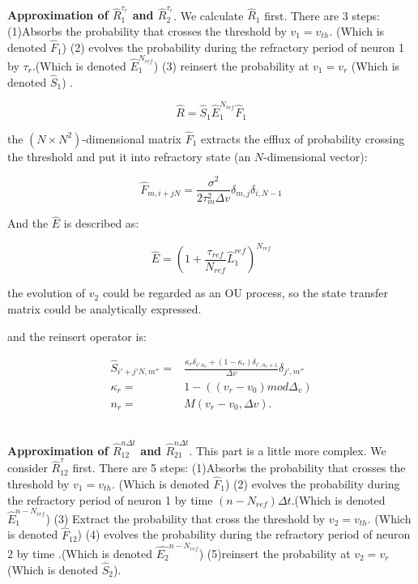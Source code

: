 \documentclass{article}
\begin{document}
	~\\
	
	\textbf{Approximation of $\hat{R}_1^{\tau_r}$ and $\hat{R}_2^{\tau_r}$}. We calculate $\hat{R}_1$ first. There are 3 steps:(1)Absorbs the probability that crosses the threshold by $v_1=v_{th}$. (Which is denoted $\hat{F}_1$) (2) evolves the probability during the refractory period of neuron 1 by $\tau_r$.(Which is denoted $\hat{E}_1^{N_{ref}}$) (3) reinsert the probability at $v_1=v_r$ (Which is denoted $\hat{S}_1$) . 
	
	\begin{equation}
     	\hat{R}=\hat{S}_1\hat{E}_1^{N_{ref}}\hat{F}_1
	\end{equation}
	
	the $(N\times N^2)$-dimensional matrix $\hat{F}_1$ extracts the efflux of probability crossing the threshold and put it into refractory state (an $N$-dimensional vector):
	
	\begin{equation}
	 	\hat{F}_{m,i+jN}=\frac{\sigma^2}{2\tau_m^2\Delta v}\delta_{m,j}\delta_{i,N-1}
	\end{equation}
	
	And the $\hat{E}$ is described as:
	
	\begin{equation}
		\hat{E}=(1+\frac{\tau_{ref}}{N_{ref}}\hat{L}_1^{ref})^{N_{ref}}
	\end{equation}
	
	the evolution of $v_2$ could be regarded as an OU process, so the state transfer matrix could be analytically expressed.
	
	and the reinsert operator is:
	
	\begin{align}
		\hat{S}_{i'+j'N,m''}=&\frac{\kappa_r\delta_{i'.n_r}+(1-\kappa_r)\delta_{i',n_r+1}}{\Delta v}\delta_{j',m''}\\
		\kappa_r=&1-((v_r-v_0) mod \Delta_v)\\
		n_r=&M(v_r-v_0,\Delta v).
	\end{align}
	
	~\\
	
	\textbf{Approximation of $\hat{R}_{12}^{n\Delta t}$ and $\hat{R}_{21}^{n\Delta t}$}. This part is a little more complex. We consider $\hat{R}_{12}^{\tau}$ first. There are 5 steps: (1)Absorbs the probability that crosses the threshold by $v_1=v_{th}$. (Which is denoted $\hat{F}_1$) (2) evolves the probability during the refractory period of neuron 1 by time $(n-N_{ref})\Delta t$.(Which is denoted $\hat{E}_1^{n-N_{ref}}$) (3) Extract the probability that cross the threshold by $v_{2}=v_{th}$.  (Which is denoted $\hat{F}_{12}$) (4) evolves the probability during the refractory period of neuron 2 by time  .(Which is denoted $\hat{E_2}^{n-N_{ref}}$) (5)reinsert the probability at $v_2=v_r$ (Which is denoted $\hat{S}_2$).
	
\end{document}
